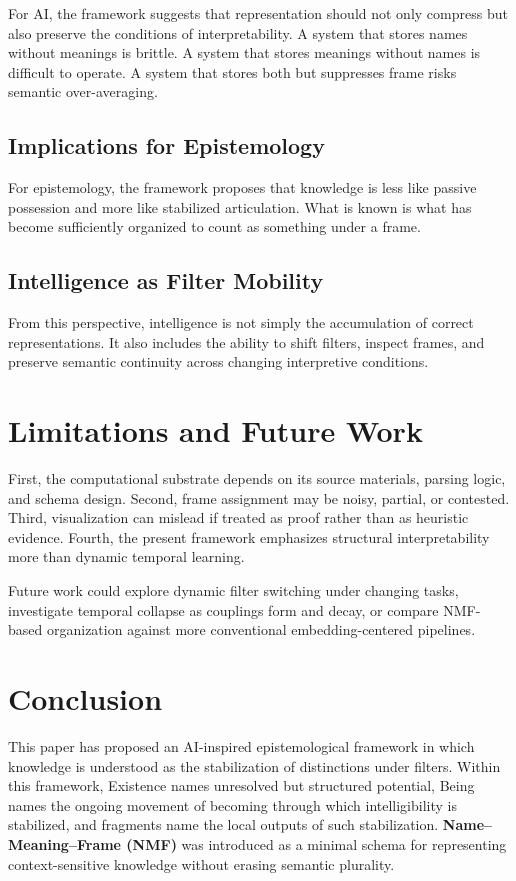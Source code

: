 \documentclass[11pt,a4paper]{article}
\newcommand{\nmf}{\textbf{Name--Meaning--Frame (NMF)}}
\begin{document}
For AI, the framework suggests that representation should not only compress but also preserve the conditions of interpretability. A system that stores names without meanings is brittle. A system that stores meanings without names is difficult to operate. A system that stores both but suppresses frame risks semantic over-averaging.

\subsection{Implications for Epistemology}

For epistemology, the framework proposes that knowledge is less like passive possession and more like stabilized articulation. What is known is what has become sufficiently organized to count as something under a frame.

\subsection{Intelligence as Filter Mobility}

From this perspective, intelligence is not simply the accumulation of correct representations. It also includes the ability to shift filters, inspect frames, and preserve semantic continuity across changing interpretive conditions.

\section{Limitations and Future Work}

First, the computational substrate depends on its source materials, parsing logic, and schema design. Second, frame assignment may be noisy, partial, or contested. Third, visualization can mislead if treated as proof rather than as heuristic evidence. Fourth, the present framework emphasizes structural interpretability more than dynamic temporal learning.

Future work could explore dynamic filter switching under changing tasks, investigate temporal collapse as couplings form and decay, or compare NMF-based organization against more conventional embedding-centered pipelines.

\section{Conclusion}

This paper has proposed an AI-inspired epistemological framework in which knowledge is understood as the stabilization of distinctions under filters. Within this framework, Existence names unresolved but structured potential, Being names the ongoing movement of becoming through which intelligibility is stabilized, and fragments name the local outputs of such stabilization. \nmf{} was introduced as a minimal schema for representing context-sensitive knowledge without erasing semantic plurality.
\end{document}
